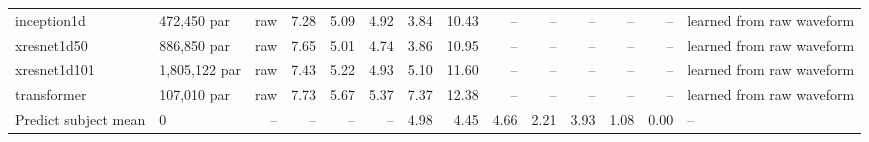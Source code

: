 \documentclass[landscape,a4paper,10pt]{article}
\begin{document}
\begin{table}[t]
{\begin{tabular}{l l r r r r rrrrrrr l}
\quad inception1d & 472,450 par & raw & 7.28 & 5.09 & 4.92 & 3.84 & 10.43 & -- & -- & -- & -- & -- & learned from raw waveform \\
\quad xresnet1d50 & 886,850 par & raw & 7.65 & 5.01 & 4.74 & 3.86 & 10.95 & -- & -- & -- & -- & -- & learned from raw waveform \\
\quad xresnet1d101 & 1,805,122 par & raw & 7.43 & 5.22 & 4.93 & 5.10 & 11.60 & -- & -- & -- & -- & -- & learned from raw waveform \\
\quad transformer & 107,010 par & raw & 7.73 & 5.67 & 5.37 & 7.37 & 12.38 & -- & -- & -- & -- & -- & learned from raw waveform \\
\midrule
Predict subject mean & 0 & -- & -- & -- & -- & 4.98 & 4.45 & 4.66 & 2.21 & 3.93 & 1.08 & 0.00 & -- \\
\bottomrule
\end{tabular}}
\end{table}
\end{document}
